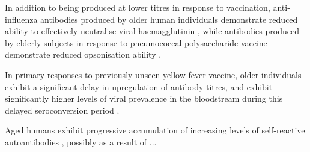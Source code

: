 In addition to being produced at lower titres in response to vaccination, anti-influenza antibodies produced by older human individuals demonstrate reduced ability to effectively neutralise viral haemagglutinin \parencite{sasaki2011limited,kogut2012bcells}, while antibodies produced by elderly subjects in response to pneumococcal polysaccharide vaccine demonstrate reduced opsonisation ability \parencite{kogut2012bcells}.

In primary responses to previously unseen yellow-fever vaccine, older individuals exhibit a significant delay in upregulation of antibody titres, and exhibit significantly higher levels of viral prevalence in the bloodstream during this delayed seroconversion period \parencite{kogut2012bcells}.

Aged humans exhibit progressive accumulation of increasing levels of self-reactive autoantibodies \parencite{kogut2012bcells}, possibly as a result of ...




